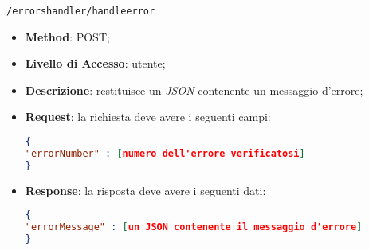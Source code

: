 \item \texttt{/errorshandler/handleerror}
		\begin{itemize}
			\item \textbf{Method}: POST;
			\item \textbf{Livello di Accesso}: utente;
			\item \textbf{Descrizione}: restituisce un \textit{JSON} contenente un messaggio d'errore;
			\item \textbf{Request}: la richiesta deve avere i seguenti campi:
\begin{lstlisting}[language=json,firstnumber=1]
{
"errorNumber" : [numero dell'errore verificatosi]
}
\end{lstlisting}
			\item \textbf{Response}: la risposta deve avere i seguenti dati:
\begin{lstlisting}[language=json,firstnumber=1]
{
"errorMessage" : [un JSON contenente il messaggio d'errore]
}
\end{lstlisting}
		\end{itemize}